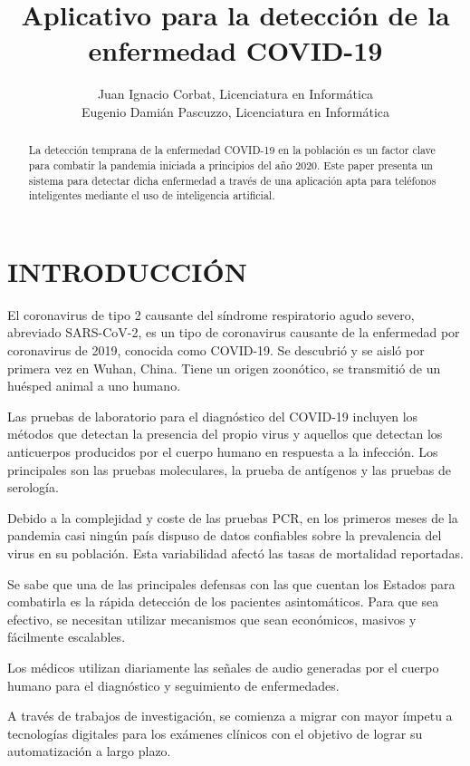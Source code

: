\documentclass[journal]{IEEEtran}
\title{Aplicativo para la detección de la enfermedad COVID-19}
\author{
Juan Ignacio Corbat, Licenciatura en Informática

Eugenio Damián Pascuzzo, Licenciatura en Informática}
\begin{document}
\maketitle

\begin{abstract}
La detección temprana de la enfermedad COVID-19 en la población es un factor clave para combatir la pandemia iniciada a principios del año 2020. Este paper presenta un sistema para detectar dicha enfermedad a través de una aplicación apta para teléfonos inteligentes mediante el uso de inteligencia artificial.
\end{abstract}

\section{INTRODUCCIÓN}
El coronavirus de tipo 2 causante del síndrome respiratorio agudo severo, abreviado SARS-CoV-2, es un tipo de coronavirus causante de la enfermedad por coronavirus de 2019, conocida como COVID-19. Se descubrió y se aisló por primera vez en Wuhan, China. Tiene un origen zoonótico, se transmitió de un huésped animal a uno humano\cite{covid-19-definición}.

Las pruebas de laboratorio para el diagnóstico del COVID-19 incluyen los métodos que detectan la presencia del propio virus y aquellos que detectan los anticuerpos producidos por el cuerpo humano en respuesta a la infección. Los principales son las pruebas moleculares, la prueba de antígenos y las pruebas de serología.

Debido a la complejidad y coste de las pruebas PCR, en los primeros meses de la pandemia casi ningún país dispuso de datos confiables sobre la prevalencia del virus en su población. Esta variabilidad afectó las tasas de mortalidad reportadas\cite{covid-19-overview}.

Se sabe que una de las principales defensas con las que cuentan los Estados para combatirla es la rápida detección de los pacientes asintomáticos. Para que sea efectivo, se necesitan utilizar mecanismos que sean económicos, masivos y fácilmente escalables.

Los médicos utilizan diariamente las señales de audio generadas por el cuerpo humano para el diagnóstico y seguimiento de enfermedades.

A través de trabajos de investigación, se comienza a migrar con mayor ímpetu a tecnologías digitales para los exámenes clínicos con el objetivo de lograr su automatización a largo plazo.
\end{document}
